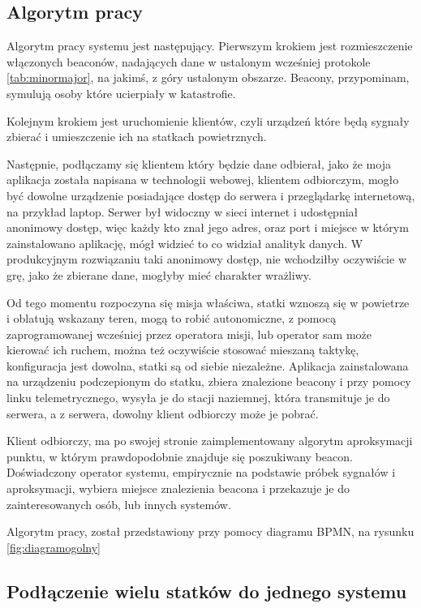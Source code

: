 \subsection{Algorytm pracy}

Algorytm pracy systemu jest następujący. Pierwszym krokiem jest rozmieszczenie włączonych beaconów, nadających dane w ustalonym wcześniej protokole \ref{tab:minormajor}, na jakimś, z góry ustalonym obszarze. Beacony, przypominam, symulują osoby które ucierpiały w katastrofie.

Kolejnym krokiem jest uruchomienie klientów, czyli urządzeń które będą sygnały zbierać i umieszczenie ich na statkach powietrznych.

Następnie, podłączamy się klientem który będzie dane odbierał, jako że moja aplikacja została napisana w technologii webowej, klientem odbiorczym, mogło być dowolne urządzenie posiadające dostęp do serwera i przeglądarkę internetową, na przykład laptop. Serwer był widoczny w sieci internet i udostępniał anonimowy dostęp, więc każdy kto znał jego adres, oraz port i miejsce w którym zainstalowano aplikację, mógł widzieć to co widział analityk danych. W produkcyjnym rozwiązaniu taki anonimowy dostęp, nie wchodziłby oczywiście w grę, jako że zbierane dane, mogłyby mieć charakter wrażliwy.

Od tego momentu rozpoczyna się misja właściwa, statki wznoszą się w powietrze i oblatują wskazany teren, mogą to robić autonomiczne, z pomocą zaprogramowanej wcześniej przez operatora misji, lub operator sam może kierować ich ruchem, można też oczywiście stosować mieszaną taktykę, konfiguracja jest dowolna, statki są od siebie niezależne. Aplikacja zainstalowana na urządzeniu podczepionym do statku, zbiera znalezione beacony i przy pomocy linku telemetrycznego, wysyła je do stacji naziemnej, która transmituje je do serwera, a z serwera, dowolny klient odbiorczy może je pobrać.

Klient odbiorczy, ma po swojej stronie zaimplementowany algorytm aproksymacji punktu, w którym prawdopodobnie znajduje się poszukiwany beacon. Doświadczony operator systemu, empirycznie na podstawie próbek sygnałów i aproksymacji, wybiera miejsce znalezienia beacona i przekazuje je do zainteresowanych osób, lub innych systemów.

Algorytm pracy, został przedstawiony przy pomocy diagramu BPMN, na rysunku \ref{fig:diagramogolny}

\subsection{Podłączenie wielu statków do jednego systemu}

